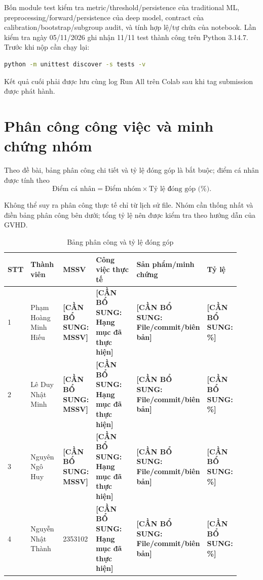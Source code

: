 \documentclass[12pt,a4paper,oneside]{report}
\newcommand{\placeholder}[1]{%
  \colorbox{placeholderbg}{\textcolor{placeholderred}{\textbf{[CẦN BỔ SUNG: #1]}}}%
}
\begin{document}
Bốn module test kiểm tra metric/threshold/persistence của traditional ML, preprocessing/forward/persistence của deep model, contract của calibration/bootstrap/subgroup audit, và tính hợp lệ/tự chứa của notebook. Lần kiểm tra ngày 05/11/2026 ghi nhận 11/11 test thành công trên Python 3.14.7. Trước khi nộp cần chạy lại:

\begin{lstlisting}[language=bash]
python -m unittest discover -s tests -v
\end{lstlisting}

\noindent Kết quả cuối phải được lưu cùng log Run All trên Colab sau khi tag submission được phát hành.

\chapter{Phân công công việc và minh chứng nhóm}

Theo đề bài, bảng phân công chi tiết và tỷ lệ đóng góp là bắt buộc; điểm cá nhân được tính theo
\[
  \text{Điểm cá nhân}=\text{Điểm nhóm}\times\text{Tỷ lệ đóng góp (\%)}.
\]

Không thể suy ra phân công thực tế chỉ từ lịch sử file. Nhóm cần thống nhất và điền bảng phân công bên dưới; tổng tỷ lệ nên được kiểm tra theo hướng dẫn của GVHD.

\begin{landscape}
\begin{table}[H]
\centering
\caption{Bảng phân công và tỷ lệ đóng góp}\label{tab:contribution}
\begin{tabularx}{\linewidth}{p{0.045\linewidth} p{0.18\linewidth} p{0.095\linewidth} p{0.35\linewidth} p{0.18\linewidth} p{0.065\linewidth}}
\toprule
\textbf{STT} & \textbf{Thành viên} & \textbf{MSSV} & \textbf{Công việc thực tế} & \textbf{Sản phẩm/minh chứng} & \textbf{Tỷ lệ} \\
\midrule
1 & Phạm Hoàng Minh Hiếu & \placeholder{MSSV} & \placeholder{Hạng mục đã thực hiện} & \placeholder{File/commit/biên bản} & \placeholder{\%} \\
2 & Lê Duy Nhật Minh & \placeholder{MSSV} & \placeholder{Hạng mục đã thực hiện} & \placeholder{File/commit/biên bản} & \placeholder{\%} \\
3 & Nguyên Ngô Huy & \placeholder{MSSV} & \placeholder{Hạng mục đã thực hiện} & \placeholder{File/commit/biên bản} & \placeholder{\%} \\
4 & Nguyễn Nhật Thành & 2353102 & \placeholder{Hạng mục đã thực hiện} & \placeholder{File/commit/biên bản} & \placeholder{\%} \\
\bottomrule
\end{tabularx}
\end{table}
\end{landscape}
\end{document}
